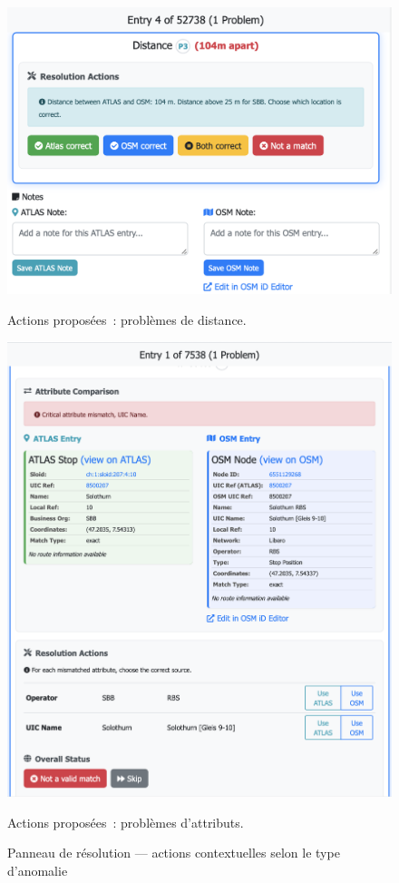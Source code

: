 \begin{figure}[h]
  \centering
  \begin{minipage}[b]{0.48\textwidth}
    \centering
    \includegraphics[width=\textwidth]{../figures/chap9/distance problem resolution actions.png}
    \caption*{Actions proposées : problèmes de distance.}
  \end{minipage}\hfill
  \begin{minipage}[b]{0.48\textwidth}
    \centering
    \includegraphics[width=\textwidth]{../figures/chap9/problem resolution actions attributes problem.png}
    \caption*{Actions proposées : problèmes d'attributs.}
  \end{minipage}
  \caption{Panneau de résolution — actions contextuelles selon le type d'anomalie}
\end{figure}

